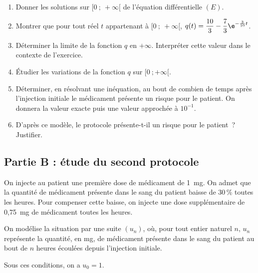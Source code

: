 \begin{enumerate}
\item Donner les solutions sur $[0~;~+\infty[$ de l'équation différentielle $(E)$.
\item Montrer que pour tout réel $t$ appartenant à $[0~;~+\infty[$, $q(t) = \dfrac{10}{3} - \dfrac{7}{3}\e^{-\frac{3}{10}t}$.
\item Déterminer la limite de la fonction $q$ en $+\infty$. Interpréter cette valeur dans le contexte de l'exercice.
\item Étudier les variations de la fonction $q$ sur $[0~;+\infty[$.
\item Déterminer, en résolvant une inéquation, au bout de combien de temps après l'injection initiale le médicament présente un risque pour le patient. On donnera la valeur exacte puis une valeur approchée à $10^{-1}$.
\item D'après ce modèle, le protocole présente-t-il un risque pour le patient~? Justifier.
\end{enumerate}


\subsection*{Partie B : étude du second protocole}

On injecte au patient une première dose de médicament de 1~mg. On admet que la quantité de médicament présente dans le sang du patient baisse de 30\,\% toutes les heures. Pour compenser cette baisse, on injecte une dose supplémentaire de 0,75~mg de médicament toutes les heures.

On modélise la situation par une suite $(u_n)$, où, pour tout entier naturel $n$, $u_n$ représente la quantité, en mg, de médicament présente dans le sang du patient au bout de $n$ heures écoulées depuis l'injection initiale.

Sous ces conditions, on a $u_0 = 1$.

